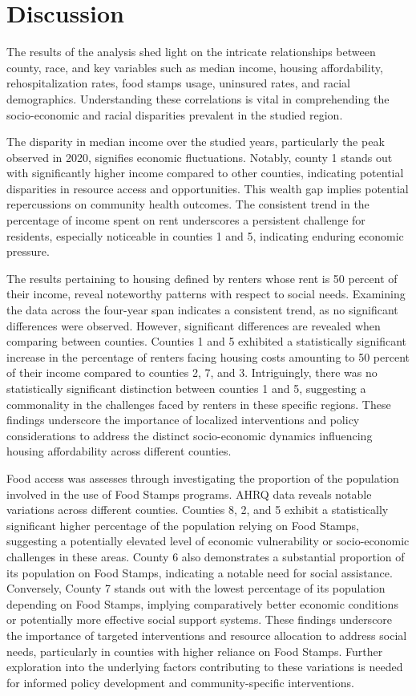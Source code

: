 \documentclass[12pt]{article}
\begin{document}
\section{Discussion}\label{sec:disc}

The results of the analysis shed light on the intricate relationships between county, race, and key 
variables such as median income, housing affordability, rehospitalization rates, food stamps usage, 
uninsured rates, and racial demographics. Understanding these correlations is vital in comprehending 
the socio-economic and racial disparities prevalent in the studied region.

The disparity in median income over the studied years, particularly the peak observed in 2020, 
signifies economic fluctuations. Notably, county 1 stands out with significantly higher income 
compared to other counties, indicating potential disparities in resource access and opportunities. 
This wealth gap implies potential repercussions on community health outcomes. The consistent trend in 
the percentage of income spent on rent underscores a persistent challenge for residents, especially 
noticeable in counties 1 and 5, indicating enduring economic pressure.

The results pertaining to housing defined by renters whose rent is 50 percent of their income, 
reveal noteworthy patterns with respect to social needs. Examining the data across the four-year span 
indicates a consistent trend, as no significant differences were observed. However, significant differences are 
revealed when comparing between counties. Counties 1 and 5 exhibited a statistically significant increase 
in the percentage of renters facing housing costs amounting to 50 percent of their income compared to 
counties 2, 7, and 3. Intriguingly, there was no statistically significant distinction between counties 
1 and 5, suggesting a commonality in the challenges faced by renters in these specific regions. These 
findings underscore the importance of localized interventions and policy considerations to address the 
distinct socio-economic dynamics influencing housing affordability across different counties.

Food access was assesses through investigating the proportion of the population involved in the use of Food Stamps programs.
AHRQ data reveals notable variations across different counties. Counties 8, 2, and 5 exhibit a statistically significant 
higher percentage of the population relying on Food Stamps, suggesting a potentially elevated level of economic 
vulnerability or socio-economic challenges in these areas. County 6 also demonstrates a substantial proportion 
of its population on Food Stamps, indicating a notable need for social assistance. Conversely, County 7 stands 
out with the lowest percentage of its population depending on Food Stamps, implying comparatively better 
economic conditions or potentially more effective social support systems. These findings underscore the 
importance of targeted interventions and resource allocation to address social needs, particularly in counties 
with higher reliance on Food Stamps. Further exploration into the underlying factors contributing to these variations 
is needed for informed policy development and community-specific interventions.
\end{document}
